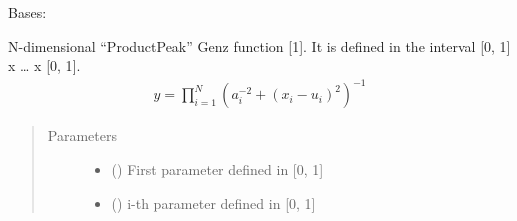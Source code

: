 \documentclass[letterpaper,10pt,english,openany,oneside]{sphinxmanual}
\begin{document}

\begin{fulllineitems}
\label{\detokenize{pygpc.testfunctions:pygpc.testfunctions.testfunctions.GenzProductPeak}}
Bases: {\hyperref[\detokenize{pygpc:pygpc.AbstractModel.AbstractModel}]{}}

N-dimensional “ProductPeak” Genz function {[}1{]}. It is defined in the interval {[}0, 1{]} x … x {[}0, 1{]}.
\begin{equation*}
\begin{split}y = \prod_{i=1}^{N} \left( a_i^{-2} + (x_i - u_i)^2 \right)^{-1}\end{split}
\end{equation*}\begin{quote}\begin{description}
\item[{Parameters}] \leavevmode\begin{itemize}
\item {} 
\sphinxstyleliteralstrong{\sphinxupquote{{[}}}\sphinxstyleliteralstrong{\sphinxupquote{{]}}} (\sphinxstyleliteralemphasis{\sphinxupquote{ {[}}}\sphinxstyleliteralemphasis{\sphinxupquote{{]}}}) \textendash{} First parameter defined in {[}0, 1{]}

\item {} 
\sphinxstyleliteralstrong{\sphinxupquote{{[}}}\sphinxstyleliteralstrong{\sphinxupquote{{]}}} (\sphinxstyleliteralemphasis{\sphinxupquote{ {[}}}\sphinxstyleliteralemphasis{\sphinxupquote{{]}}}) \textendash{} i-th parameter defined in {[}0, 1{]}


\end{itemize}
\end{description}
\end{quote}
\end{fulllineitems}
\end{document}
